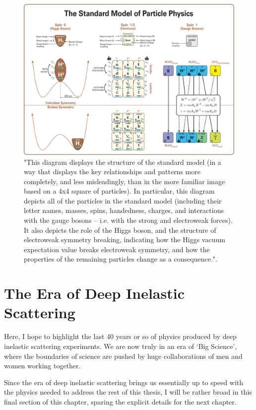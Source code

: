 \begin{figure}[ht]
	\centering
	\includegraphics[width=\linewidth]{./figures/standard_model_complete_lowres.png}
	\caption{
		"This diagram displays the structure of the standard model (in a way that
		displays the key relationships and patterns more completely, and less
		misleadingly, than in the more familiar image based on a 4x4 square of
		particles). In particular, this diagram depicts all of the particles in the
		standard model (including their letter names, masses, spins, handedness,
		charges, and interactions with the gauge bosons -- i.e. with the strong and
		electroweak forces). It also depicts the role of the Higgs boson, and the
		structure of electroweak symmetry breaking, indicating how the Higgs vacuum
		expectation value breaks electroweak symmetry, and how the properties of the
		remaining particles change as a consequence."\cite{Boyle2014}.
	}
	\label{fig:standardmodel}
\end{figure}


\clearpage
\section{The Era of Deep Inelastic Scattering}

Here, I hope to highlight the last 40 years or so of physics produced by deep
inelastic scattering experiments. We are now truly in an era of `Big Science',
where the boundaries of science are pushed by huge collaborations of men and
women working together. 

Since the era of deep inelastic scattering brings us essentially up to speed
with the physics needed to address the rest of this thesis, I will be rather
broad in this final section of this chapter, sparing the explicit details for
the next chapter.

